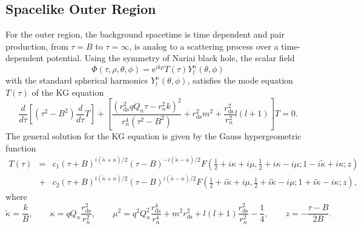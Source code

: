 \documentclass[aps,nofootinbib,superscriptaddress
]{revtex4}
\begin{document}
\subsection{Spacelike Outer Region}
For the outer region, the background spacetime is time dependent and pair production, from $\tau = B$ to $\tau = \infty$, is analog to a scattering process over a time-dependent potential. Using the symmetry of Nariai black hole, the scalar field
\begin{equation} \label{ansatz}
\Phi(\tau, \rho, \theta, \phi) = \mathrm{e}^{i k \rho} T(\tau) Y_l^n(\theta, \phi)
\end{equation}
with the standard spherical harmonics $Y_l^n(\theta, \phi)$, satisfies the mode equation $T(\tau)$ of the KG equation
\begin{equation} \label{eq_KGt}
\frac{d}{d\tau} \left[ (\tau^2 - B^2) \frac{d}{d\tau} T \right] + \left[ \frac{(r_\mathrm{ds}^2 q Q_n \tau - r_n^2 k)^2}{r_n^4 (\tau^2 - B^2)} + r_\mathrm{ds}^2 m^2 + \frac{r_\mathrm{ds}^2}{r_n^2} l (l + 1) \right] T = 0.
\end{equation}
The general solution for the KG equation is given by the Gauss hypergeometric function
\begin{eqnarray}
T(\tau) &=& c_1 (\tau + B)^{i (\tilde{\kappa} + \kappa)/2} (\tau - B)^{-i (\tilde{\kappa} - \kappa)/2} F\left( \frac12 + i \kappa + i \mu, \frac12 + i \kappa - i \mu; 1 - i \tilde{\kappa} + i \kappa; z \right)
\nonumber\\
&+& c_2 (\tau + B)^{i (\tilde{\kappa} + \kappa)/2} (\tau - B)^{i (\tilde{\kappa} - \kappa)/2} F\left( \frac12 + i \tilde{\kappa} + i \mu, \frac12 + i \tilde{\kappa} - i \mu; 1 + i \tilde{\kappa} - i \kappa; z \right),
\end{eqnarray}
where
\begin{equation}
\tilde{\kappa} = \frac{k}{B}, \qquad \kappa = q Q_n \frac{r_\mathrm{ds}^2}{r_n^2}, \qquad \mu^2 = q^2 Q_n^2 \frac{r_\mathrm{ds}^4}{r_n^4} + m^2 r_\mathrm{ds}^2 + l (l +1) \frac{r_\mathrm{ds}^2}{r_n^2} - \frac14, \qquad z = - \frac{\tau - B}{2 B}.
\end{equation}
\end{document}
